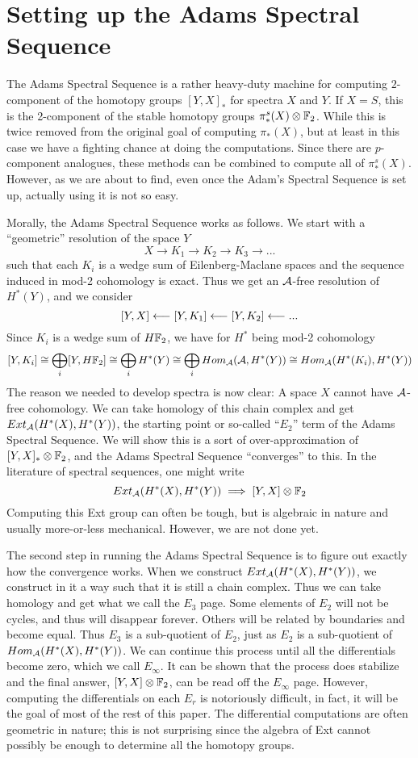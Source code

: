 \section{Setting up the Adams Spectral Sequence}

The Adams Spectral Sequence is a rather heavy-duty machine for computing $2$-component of the homotopy groups $[Y,X]_*$ for spectra $X$ and $Y$.  
If $X=S$, this is the 2-component of the stable homotopy groups $\pi^s_*(X)\otimes \mathbb{F}_2$.  
While this is twice removed from the original goal of computing $\pi_*(X)$, but at least in this case we have a fighting chance at doing the computations.
Since there are $p$-component analogues, these methods can be combined to compute all of $\pi_*^s(X)$.  
However, as we are about to find, even once the Adam's Spectral Sequence is set up, actually using it is not so easy.  

Morally, the Adams Spectral Sequence works as follows.  
We start with a ``geometric'' resolution of the space $Y$
\[X\to K_1\to K_2\to K_3\to ...\]
such that each $K_i$ is a wedge sum of Eilenberg-Maclane spaces and the sequence induced in mod-2 cohomology is exact.  
Thus we get an $\mathcal{A}$-free resolution of $H^*(Y)$, and we consider 
\[[Y,X]\longleftarrow [Y,K_1]\longleftarrow [Y,K_2]\longleftarrow ...\]
Since $K_i$ is a wedge sum of $H\mathbb{F}_2$, we have for $H^*$ being mod-2 cohomology
\[[Y,K_i]\cong \bigoplus_i [Y,H\mathbb{F}_2]\cong \bigoplus_i H^*(Y) \cong \bigoplus_i Hom_{\mathcal{A}}(\mathcal{A},H^*(Y))\cong Hom_{\mathcal{A}}(H^*(K_i),H^*(Y))\]
The reason we needed to develop spectra is now clear: A space $X$ cannot have $\mathcal{A}$-free cohomology.  
We can take homology of this chain complex and get $Ext_{\mathcal{A}}(H^*(X),H^*(Y))$, the starting point or so-called ``$E_2$'' term of the Adams Spectral Sequence.  
We will show this is a sort of over-approximation of $[Y,X]_*\otimes \mathbb{F}_2$, and the Adams Spectral Sequence ``converges'' to this.  
In the literature of spectral sequences, one might write
\[Ext_{\mathcal{A}}(H^*(X),H^*(Y))\implies [Y,X]\otimes \mathbb{F}_2\]
Computing this Ext group can often be tough, but is algebraic in nature and usually more-or-less mechanical.  
However, we are not done yet.  


The second step in running the Adams Spectral Sequence is to figure out exactly how the convergence works.
When we construct $Ext_{\mathcal{A}}(H^*(X),H^*(Y))$, we construct in it a way such that it is still a chain complex.
Thus we can take homology and get what we call the $E_3$ page.
Some elements of $E_2$ will not be cycles, and thus will disappear forever.  
Others will be related by boundaries and become equal.  
Thus $E_3$ is a sub-quotient of $E_2$, just as $E_2$ is a sub-quotient of $Hom_{\mathcal{A}}(H^*(X),H^*(Y))$.  
We can continue this process until all the differentials become zero, which we call $E_\infty$.  
It can be shown that the process does stabilize and the final answer, $[Y,X]\otimes \mathbb{F}_2$, can be read off the $E_\infty$ page. 
However, computing the differentials on each $E_r$ is notoriously difficult, in fact, it will be the goal of most of the rest of this paper.  
The differential computations are often geometric in nature; this is not surprising since the algebra of Ext cannot possibly be enough to determine all the homotopy groups.  

